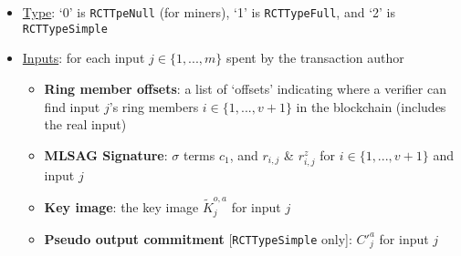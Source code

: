 \begin{itemize}
    \item \underline{Type}: `0' is {\tt RCTTpeNull} (for miners), `1' is {\tt RCTTypeFull}, and `2' is {\tt RCTTypeSimple} %
    \item \underline{Inputs}: for each input $j \in \{1,...,m\}$ spent by the transaction author
    \begin{itemize}
        \item \textbf{Ring member offsets}: a list of `offsets' indicating where a verifier can find input $j$'s ring members $i \in \{1,...,v+1\}$ in the blockchain (includes the real input)
        \item \textbf{MLSAG Signature}: $\sigma$ terms $c_1$, and $r_{i,j}$ \& $r^{z}_{i,j}$ for $i \in \{1,...,v+1\}$ and input $j$
        \item \textbf{Key image}: the key image $\tilde{K}^{o,a}_j$ for input $j$
        \item \textbf{Pseudo output commitment} {[{\tt RCTTypeSimple} only]}: $C'^{a}_j$ for input $j$
    \end{itemize}
    

\end{itemize}
